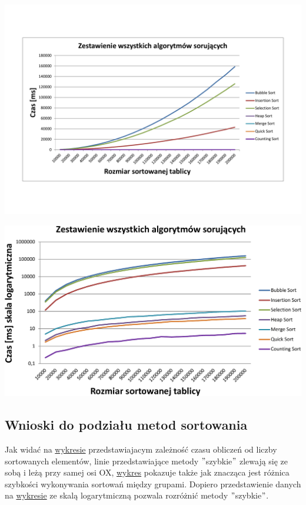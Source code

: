 \documentclass[polish,polish,a4paper]{article}
\begin{document}
\begin{spacing}{1.5}
	
\begin{minipage}[H]{\textwidth}
	\centering
	\includegraphics[scale=0.6]{zad2wsznor.pdf}
	\label{fig:2wszn}
\end{minipage}

\begin{minipage}[H]{\textwidth}
	\centering
	\includegraphics[scale=0.6]{zad2wszlog.pdf}
	\label{fig:2wszl}
\end{minipage}
	
	\subsection*{Wnioski do podziału metod sortowania}
	
	Jak widać na \hyperref[fig:2wszn]{wykresie} przedstawiajacym zależność czasu obliczeń od liczby sortowanych elementów, linie przedstawiające metody $ " $szybkie$ " $ zlewają się ze sobą i leżą przy samej osi OX, \hyperref[fig:2wszn]{wykres} pokazuje także jak znacząca jest różnica szybkości wykonywania sortowań między grupami. Dopiero przedstawienie danych na \hyperref[fig:2wszl]{wykresie} ze skalą logarytmiczną pozwala rozróżnić metody $"$szybkie$"$.
	

\end{spacing}
\end{document}
